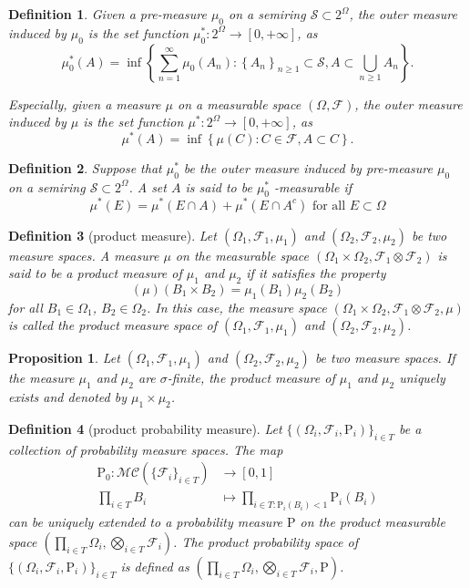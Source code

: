 \documentclass{report}
\newtheorem{definition}{Definition}[section]
\newtheorem{proposition}{Proposition}[section]
\theoremstyle{nonumberplain}
\begin{document}
\begin{definition}
	Given a pre-measure $\mu_0$ on a semiring $\mathcal{S}\subset2^\Omega$, the \emph{outer measure induced by $\mu_0$} is the set function $\mu_0^*:2^\Omega\to[0,+\infty]$, as
	\[
	\mu^{*}_0(A) = \inf \left\{\sum_{n=1}^{\infty} \mu_0\left(A_{n}\right):\left\{A_{n}\right\}_{n \geq 1} \subset \mathcal{S}, A \subset \bigcup_{n \geq 1} A_{n}\right\}.
	\]

	Especially, given a measure $\mu$ on a measurable space $(\Omega,\mathcal{F})$, the \emph{outer measure induced by $\mu$} is the set function $\mu^*:2^\Omega\to[0,+\infty]$, as
	\[
	\mu^{*}(A) = \inf \left\{ \mu\left(C\right):C \in\mathcal{F}, A \subset C\right\}.
	\]
\end{definition}
\begin{definition} 
Suppose that $\mu_0^*$ be the outer measure induced by pre-measure $\mu_0$ on a semiring $\mathcal{S}\subset2^\Omega$. A set $A$ is said to be $\mu_0^{*}$ -measurable if
\[
\mu^{*}(E)=\mu^{*}(E \cap A)+\mu^{*}\left(E \cap A^{c}\right) \text { for all } E \subset \Omega
\]
\end{definition}
\begin{definition}[product measure]
	Let $(\Omega_1,\mathcal{F}_1,\mu_1)$ and $(\Omega_2,\mathcal{F}_2,\mu_2)$ be two measure spaces. 
	A measure $\mu$ on the measurable space $(\Omega_1\times\Omega_2,\mathcal{F}_1\otimes\mathcal{F}_2)$ is said to be a \emph{product measure} of $\mu_1$ and $\mu_2$ if it satisfies the property
	\[
	\left(\mu\right)\left(B_{1} \times B_{2}\right)=\mu_{1}\left(B_{1}\right) \mu_{2}\left(B_{2}\right)
	\]
	for all $B_1\in\Omega_1$, $B_2\in\Omega_2$. In this case, the measure space $(\Omega_1\times\Omega_2,\mathcal{F}_1\otimes\mathcal{F}_2,\mu)$ is called the product measure space of $(\Omega_1,\mathcal{F}_1,\mu_1)$ and $(\Omega_2,\mathcal{F}_2,\mu_2)$.
\end{definition}

\begin{proposition}
	Let $(\Omega_1,\mathcal{F}_1,\mu_1)$ and $(\Omega_2,\mathcal{F}_2,\mu_2)$ be two measure spaces. If the measure $\mu_1$ and $\mu_2$ are $\sigma$-finite, the product measure of $\mu_1$ and $\mu_2$ uniquely exists and denoted by $\mu_1\times\mu_2$.
\end{proposition}

\begin{definition}[product probability measure]
	Let $\{(\Omega_i,\mathcal{F}_i,\mathrm{P}_i)\}_{i\in T}$ be a collection of probability measure spaces. 
	The map 
	\begin{align*}
	\mathrm{P}_0: \mathcal{MC}(\{\mathcal{F}_i\}_{i\in T})&\longrightarrow[0,1]\\
	\prod_{i\in T}B_i&\longmapsto\prod_{i\in T: \mathrm{P}_i(B_i)<1}\mathrm{P}_i\left(B_i\right)
	\end{align*}
	can be uniquely extended to a probability measure $\mathrm{P}$ on the product measurable space $\left(\prod_{i\in T}\Omega_i,\bigotimes_{i\in T}\mathcal{F}_i\right)$. The \emph{product probability space} of $\{(\Omega_i,\mathcal{F}_i,\mathrm{P}_i)\}_{i\in T}$ is defined as $\left(\prod_{i\in T}\Omega_i,\bigotimes_{i\in T}\mathcal{F}_i,\mathrm{P}\right)$.
\end{definition}
\end{document}
